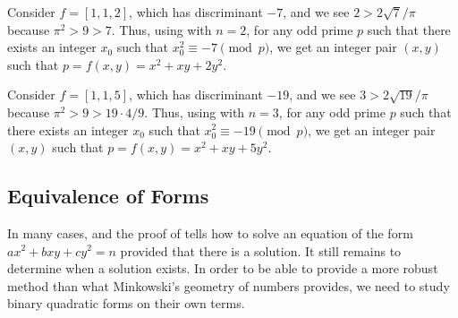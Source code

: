\documentclass[../notes.tex]{subfiles}
\begin{document}
\begin{example} \label{ex:primes-of-form-7}
	Consider $f=[1,1,2]$, which has discriminant $-7$, and we see $2>2\sqrt7/\pi$ because $\pi^2>9>7$. Thus, using  with $n=2$, for any odd prime $p$ such that there exists an integer $x_0$ such that $x_0^2\equiv-7\pmod p$, we get an integer pair $(x,y)$ such that $p=f(x,y)=x^2+xy+2y^2$.
\end{example}
\begin{example} \label{ex:primes-of-form-19}
	Consider $f=[1,1,5]$, which has discriminant $-19$, and we see $3>2\sqrt{19}/\pi$ because $\pi^2>9>19\cdot4/9$. Thus, using  with $n=3$, for any odd prime $p$ such that there exists an integer $x_0$ such that $x_0^2\equiv-19\pmod p$, we get an integer pair $(x,y)$ such that $p=f(x,y)=x^2+xy+5y^2$.
\end{example}

\subsection{Equivalence of Forms}
In many cases,  and the proof of  tells how to solve an equation of the form $ax^2+bxy+cy^2=n$ provided that there is a solution. It still remains to determine when a solution exists. In order to be able to provide a more robust method than what Minkowski's geometry of numbers provides, we need to study binary quadratic forms on their own terms.
\end{document}

